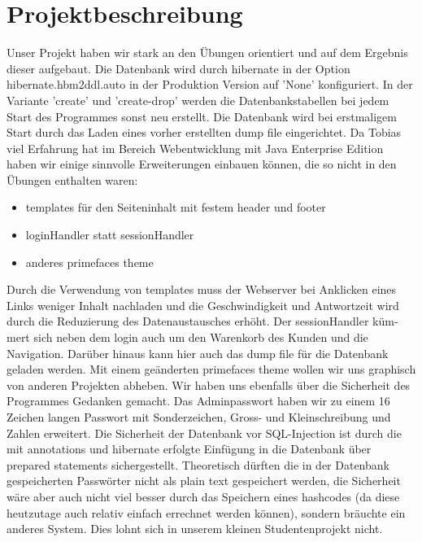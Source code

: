 \documentclass[a4paper]{article}
\begin{document}
%



\newpage
\tableofcontents
\thispagestyle{empty}

\newpage
\section{Projektbeschreibung}
Unser Projekt haben wir stark an den Übungen orientiert und auf dem Ergebnis dieser aufgebaut. 
Die Datenbank wird durch hibernate in der Option hibernate.hbm2ddl.auto in der Produktion Version auf 'None' konfiguriert. In der Variante 'create' und 'create-drop' werden die Datenbankstabellen bei jedem Start des Programmes sonst neu erstellt.
Die Datenbank wird bei erstmaligem Start durch das Laden eines vorher erstellten dump file eingerichtet.
Da Tobias viel Erfahrung hat im Bereich Webentwicklung mit Java Enterprise Edition haben wir einige sinnvolle Erweiterungen einbauen können, die so nicht in den Übungen enthalten waren:
\begin{itemize}
	\item templates für den Seiteninhalt mit festem header und footer 
	\item loginHandler statt sessionHandler
	\item anderes primefaces theme
\end{itemize}
Durch die Verwendung von templates muss der Webserver bei Anklicken eines Links weniger Inhalt nachladen und die Geschwindigkeit und Antwortzeit wird durch die Reduzierung des Datenaustausches erhöht.
Der sessionHandler küm-mert sich neben dem login auch um den Warenkorb des Kunden und die Navigation. Darüber hinaus kann hier auch das dump file für die Datenbank geladen werden.
Mit einem geänderten primefaces theme wollen wir uns graphisch von anderen Projekten abheben.
\newline
Wir haben uns ebenfalls über die Sicherheit des Programmes Gedanken gemacht. Das Adminpasswort haben wir zu einem 16 Zeichen langen Passwort mit Sonderzeichen, Gross- und Kleinschreibung und Zahlen erweitert. Die Sicherheit der Datenbank vor SQL-Injection ist durch die mit annotations und hibernate erfolgte Einfügung in die Datenbank über prepared statements sichergestellt. Theoretisch dürften die in der Datenbank gespeicherten Passwörter nicht als plain text gespeichert werden, die Sicherheit wäre aber auch nicht viel besser durch das Speichern eines hashcodes (da diese heutzutage auch relativ einfach errechnet werden können), sondern bräuchte ein anderes System. Dies lohnt sich in unserem kleinen Studentenprojekt nicht.
\end{document}
